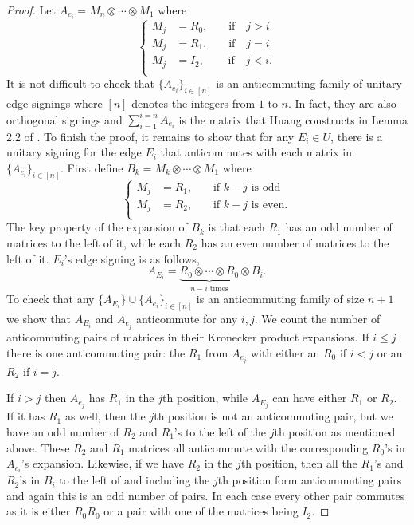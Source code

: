 \begin{proof}
    Let $A_{e_i} = M_n \otimes \cdots \otimes M_1$ where 
\[
\begin{cases}
    M_j &= R_0,  \quad \; \; \; \text{if} \quad j > i\\
    M_j &= R_1,  \quad \; \; \; \text{if} \quad j = i\\
    M_j &= I_2,  \quad \; \; \; \; \text{if} \quad j < i.\\
\end{cases}
\]
It is not difficult to check 
that $\{A_{e_i}\}_{i \in [n]}$ is an anticommuting 
family of unitary edge signings where $[n]$ denotes the integers from $1$ to $n$. 
In fact, they are also orthogonal signings and $\sum_{i=1}^{i=n} A_{e_i}$ is the matrix that Huang 
constructs in Lemma 2.2 of \cite{Hu}. To finish the proof, 
it remains to show that for any $E_i \in U$, there is a unitary signing 
for the edge $E_i$ that anticommutes with each matrix 
in $\{A_{e_i}\}_{i \in [n]}$. 
First define $B_k = M_k \otimes \cdots \otimes M_1$ where  
\[
\begin{cases}
    M_j &= R_1,  \quad \; \; \; \text{if $k-j$ is odd} \\
    M_j &= R_2,  \quad \; \; \; \text{if $k-j$ is even.} \\
\end{cases}
\]
The key property of the expansion of $B_k$ is that each $R_1$ 
has an odd number of matrices to the left of it, while each 
$R_2$ has an even number of matrices to the left of it. 
$E_i$'s edge signing is as follows, 
\[
A_{E_i} = 
\underbrace{R_0 \otimes \cdots 
\otimes R_0}_{n - i \text{ times}} \otimes B_i.
\] 
To check that any $\{A_{E_i}\} \cup \{A_{e_i}\}_{i \in [n]}$ 
is an anticommuting family of size $n+1$ we show that $A_{E_i}$ 
and $A_{e_j}$ anticommute for any $i, j$. We count the 
number of anticommuting pairs of matrices in their Kronecker 
product expansions. If $i \leq j$ there is one 
anticommuting pair: the $R_1$ 
from $A_{e_j}$ with either an $R_0$ if $i<j$ or an $R_2$ if $i = j$. 

If $i > j$ then $A_{e_j}$ has $R_1$ in the $j$th position, 
while $A_{E_j}$ can have either $R_1$ or $R_2$. If it 
has $R_1$ as well, then the $j$th position is not an 
anticommuting pair, but we have an odd number of $R_2$ and $R_1$'s 
to the left of the $j$th position as mentioned above. 
These $R_2$ and $R_1$ matrices all anticommute with the 
corresponding $R_0$'s in $A_{e_i}$'s expansion. 
Likewise, if we have $R_2$ in the $j$th position, then all the 
$R_1$'s and $R_2$'s in $B_i$ to the left of and including the 
$j$th position form anticommuting pairs and again this is an odd 
number of pairs. In each case every other pair commutes as 
it is either $R_0R_0$ or a pair with one of the matrices being $I_2$.
\end{proof}

